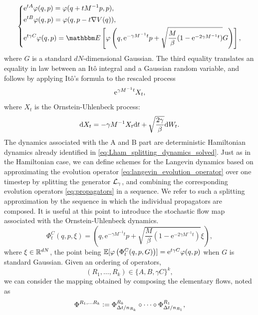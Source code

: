 \begin{equation}
  \label{eq:propagators}
  \left\{\begin{aligned}
    &\mathrm{e}^{tA}\varphi(q,p)=\varphi(q+tM^{-1}p,p),\\
    &\mathrm{e}^{tB}\varphi(q,p)=\varphi(q,p-t\nabla V(q)),\\
   &\mathrm{e}^{t\gamma C}\varphi(q,p)=\mathbbm E \left[\varphi \left(q, \mathrm e^{-\gamma M^{-1}t}p + \sqrt{\frac{M}{\beta}(1-\mathrm{e}^{-2\gamma M^{-1}t})}G\right)\right],
\end{aligned}\right.
\end{equation}
where $G$ is a standard $dN$-dimensional Gaussian. The third equality translates an equality in law between an Itô integral and a Gaussian random variable, and follows by applying Itô's formula to the rescaled process
$$\mathrm{e}^{\gamma M^{-1}t}X_t,$$
where $X_t$ is the Ornstein-Uhlenbeck process:
\begin{equation}
    \mathrm{d} X_t=-\gamma M^{-1}X_t\mathrm{d} t+\sqrt{\frac{2\gamma}{\beta}}\mathrm{d} W_t.
\end{equation}
 The dynamics associated with the A and B part are deterministic Hamiltonian dynamics already identified in \eqref{eq:Lham_splitting_dynamics_solved}.
Just as in the Hamiltonian case, we can define schemes for the Langevin dynamics based on approximating the evolution operator \eqref{eq:langevin_evolution_operator} over one timestep by splitting the generator $\mathcal{L}_\gamma$, and combining the corresponding evolution operators \eqref{eq:propagators} in a sequence.
We refer to such a splitting approximation by the sequence in which the individual propagators are composed. It is useful at this point to introduce the stochastic flow map associated with the Ornstein-Uhlenbeck dynamics.
\begin{equation}
    \label{eq:stochastic_flow_c}
    \Phi_t^C(q,p,\xi)=\left(q, \mathrm e^{-\gamma M^{-1}t}p + \sqrt{\frac{M}{\beta}(1-\mathrm{e}^{-2\gamma M^{-1}t})}\xi\right),
\end{equation}
where $\xi\in \mathbb{R}^{dN}$, the point being $\mathbb{E}[\varphi\left(\Phi_t^C(q,p,G)\right)]=\mathrm{e}^{t\gamma C}\varphi(q,p)$ when $G$ is standard Gaussian.
Given an ordering of operators, 
\begin{equation}\label{eq:splitting_ordering}(R_1,\dots,R_k)\in \{A,B,\gamma C\}^k,\end{equation}
we can consider the mapping obtained by composing the elementary flows, noted as
\begin{equation}\label{eq:markov_mapping}\Phi^{R_1,\dots R_k}\mathrel{\mathop:}=\Phi_{\Delta t/n_{R_k}}^{R_k}\circ\dots\circ\Phi_{\Delta t/n_{R_1}}^{R_1},
\end{equation}

